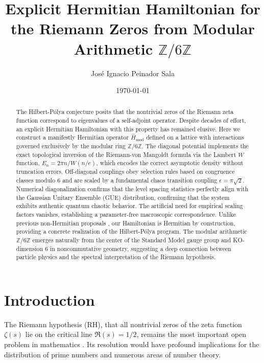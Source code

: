 \documentclass[prl,aps,floatfix,superscriptaddress,10pt]{revtex4-2}
\newcommand{\Zmod}{\mathbb{Z}/6\mathbb{Z}}
\begin{document}
\title{Explicit Hermitian Hamiltonian for the Riemann Zeros from Modular Arithmetic \texorpdfstring{$\Zmod$}{Z/6Z}}

\author{José Ignacio Peinador Sala }

\date{\today}

\begin{abstract}
The Hilbert-P\'olya conjecture posits that the nontrivial zeros of the Riemann zeta function correspond to eigenvalues of a self-adjoint operator.
Despite decades of effort, an explicit Hermitian Hamiltonian with this property has remained elusive.
Here we construct a manifestly Hermitian operator $\hat{H}_{\text{mod}}$ defined on a lattice with interactions governed exclusively by the modular ring $\mathbb{Z}/6\mathbb{Z}$.
The diagonal potential implements the exact topological inversion of the Riemann-von Mangoldt formula via the Lambert $W$ function, $E_n = 2\pi n / W(n/e)$, which encodes the correct asymptotic density without truncation errors.
Off-diagonal couplings obey selection rules based on congruence classes modulo 6 and are scaled by a fundamental chaos transition coupling $\epsilon = \pi \sqrt{2}$.
Numerical diagonalization confirms that the level spacing statistics perfectly align with the Gaussian Unitary Ensemble (GUE) distribution, confirming that the system exhibits authentic quantum chaotic behavior.
The artificial need for empirical scaling factors vanishes, establishing a parameter-free macroscopic correspondence.
Unlike previous non-Hermitian proposals \cite{Bender2017}, our Hamiltonian is Hermitian by construction, providing a concrete realization of the Hilbert-P\'olya program. The modular arithmetic $\Zmod$ emerges naturally from the center of the Standard Model gauge group and KO-dimension 6 in noncommutative geometry, suggesting a deep connection between particle physics and the spectral interpretation of the Riemann hypothesis.
\end{abstract}

\maketitle

\section{Introduction}

The Riemann hypothesis (RH), that all nontrivial zeros of the zeta function $\zeta(s)$ lie on the critical line $\Re(s) = 1/2$, remains the most important open problem in mathematics \cite{Riemann1859}. Its resolution would have profound implications for the 
distribution of prime numbers and numerous areas of number theory.
\end{document}
